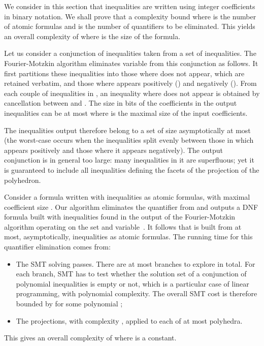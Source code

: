 We consider in this section that inequalities are written using integer coefficients in binary notation. We shall prove that a complexity bound  where  is the number of atomic formulas and  is the number of quantifiers to be eliminated. This yields an overall complexity of  where  is the size of the formula.

Let us consider a conjunction of inequalities taken from a set of  inequalities. The Fourier-Motzkin algorithm \cite{BradleyManna07,imbert93fouriers} eliminates variable  from this conjunction as follows. It first partitions these inequalities into those where  does not appear, which are retained verbatim, and those where  appears positively () and negatively (). From each couple of inequalities  in , an inequality where  does not appear is obtained by cancellation between  and . The size in bits of the coefficients in the output inequalities can be at most  where  is the maximal size of the input coefficients.

The inequalities output therefore belong to a set of size asymptotically at most  (the worst-case occurs when the inequalities split evenly between those in which  appears positively and those where it appears negatively). The output conjunction is in general too large: many inequalities in it are superfluous; yet it is guaranteed to include all inequalities defining the facets of the projection of the polyhedron.

Consider a formula  written with inequalities  as atomic formulas, with maximal coefficient size . Our algorithm eliminates the quantifier from  and outputs a DNF formula  built with inequalities found in the output of the Fourier-Motzkin algorithm operating on the set  and variable~. It follows that  is built from at most, asymptotically,  inequalities as atomic formulas. The running time for this quantifier elimination comes from:
\begin{itemize}
\item The SMT solving passes. There are at most  branches to explore in total. For each branch, SMT has to test whether the solution set of a conjunction of polynomial inequalities is empty or not, which is a particular case of linear programming, with polynomial complexity. The overall SMT cost is therefore bounded by  for some polynomial ;
\item The projections, with complexity , applied to each of at most  polyhedra.
\end{itemize}
This gives an overall complexity of  where  is a constant.

